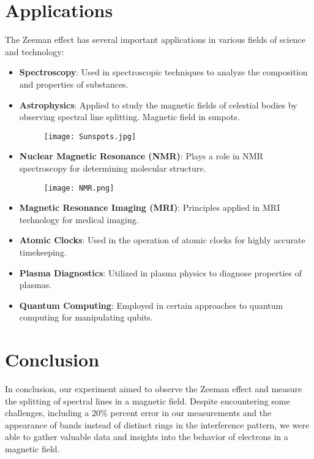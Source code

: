 \documentclass[11pt]{article}
\begin{document}
	
	
\clearpage	

	\section{Applications}
	
	The Zeeman effect has several important applications in various fields of science and technology:
	
	\begin{itemize}
		\item \textbf{Spectroscopy}: Used in spectroscopic techniques to analyze the composition and properties of substances.
		\item \textbf{Astrophysics}: Applied to study the magnetic fields of celestial bodies by observing spectral line splitting. Magnetic field in sunpots.
		\begin{figure}[htbp]
			\centering
			\texttt{[image: Sunspots.jpg]}
		\end{figure}
		\item \textbf{Nuclear Magnetic Resonance (NMR)}: Plays a role in NMR spectroscopy for determining molecular structure.
		\begin{figure}[htbp]
			\centering
			\texttt{[image: NMR.png]}
		\end{figure}
		\item \textbf{Magnetic Resonance Imaging (MRI)}: Principles applied in MRI technology for medical imaging.
		\item \textbf{Atomic Clocks}: Used in the operation of atomic clocks for highly accurate timekeeping.
		\item \textbf{Plasma Diagnostics}: Utilized in plasma physics to diagnose properties of plasmas.
		\item \textbf{Quantum Computing}: Employed in certain approaches to quantum computing for manipulating qubits.
	\end{itemize}
	
	
\clearpage

	\section{Conclusion}
	
	In conclusion, our experiment aimed to observe the Zeeman effect and measure the splitting of spectral lines in a magnetic field. Despite encountering some challenges, including a $20\%$ percent error in our measurements and the appearance of bands instead of distinct rings in the interference pattern, we were able to gather valuable data and insights into the behavior of electrons in a magnetic field.
	
\end{document}

